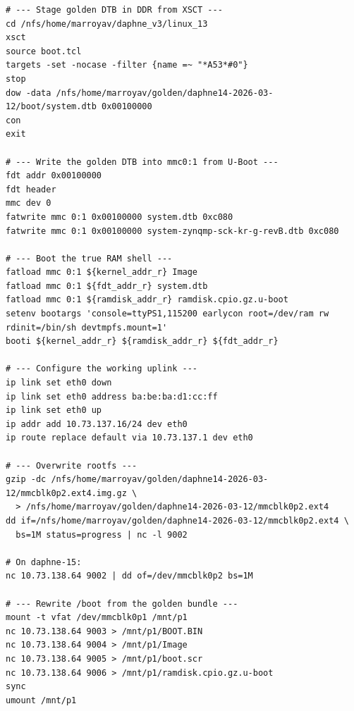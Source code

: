 \documentclass[a4paper,11pt]{article}
\begin{document}
\begin{listing}[H]
\begin{verbatim}
# --- Stage golden DTB in DDR from XSCT ---
cd /nfs/home/marroyav/daphne_v3/linux_13
xsct
source boot.tcl
targets -set -nocase -filter {name =~ "*A53*#0"}
stop
dow -data /nfs/home/marroyav/golden/daphne14-2026-03-12/boot/system.dtb 0x00100000
con
exit

# --- Write the golden DTB into mmc0:1 from U-Boot ---
fdt addr 0x00100000
fdt header
mmc dev 0
fatwrite mmc 0:1 0x00100000 system.dtb 0xc080
fatwrite mmc 0:1 0x00100000 system-zynqmp-sck-kr-g-revB.dtb 0xc080

# --- Boot the true RAM shell ---
fatload mmc 0:1 ${kernel_addr_r} Image
fatload mmc 0:1 ${fdt_addr_r} system.dtb
fatload mmc 0:1 ${ramdisk_addr_r} ramdisk.cpio.gz.u-boot
setenv bootargs 'console=ttyPS1,115200 earlycon root=/dev/ram rw rdinit=/bin/sh devtmpfs.mount=1'
booti ${kernel_addr_r} ${ramdisk_addr_r} ${fdt_addr_r}

# --- Configure the working uplink ---
ip link set eth0 down
ip link set eth0 address ba:be:ba:d1:cc:ff
ip link set eth0 up
ip addr add 10.73.137.16/24 dev eth0
ip route replace default via 10.73.137.1 dev eth0

# --- Overwrite rootfs ---
gzip -dc /nfs/home/marroyav/golden/daphne14-2026-03-12/mmcblk0p2.ext4.img.gz \
  > /nfs/home/marroyav/golden/daphne14-2026-03-12/mmcblk0p2.ext4
dd if=/nfs/home/marroyav/golden/daphne14-2026-03-12/mmcblk0p2.ext4 \
  bs=1M status=progress | nc -l 9002

# On daphne-15:
nc 10.73.138.64 9002 | dd of=/dev/mmcblk0p2 bs=1M

# --- Rewrite /boot from the golden bundle ---
mount -t vfat /dev/mmcblk0p1 /mnt/p1
nc 10.73.138.64 9003 > /mnt/p1/BOOT.BIN
nc 10.73.138.64 9004 > /mnt/p1/Image
nc 10.73.138.64 9005 > /mnt/p1/boot.scr
nc 10.73.138.64 9006 > /mnt/p1/ramdisk.cpio.gz.u-boot
sync
umount /mnt/p1
\end{verbatim}
\caption{Everything needed for the 2026-03-12 recovery}
\end{listing}
\end{document}
